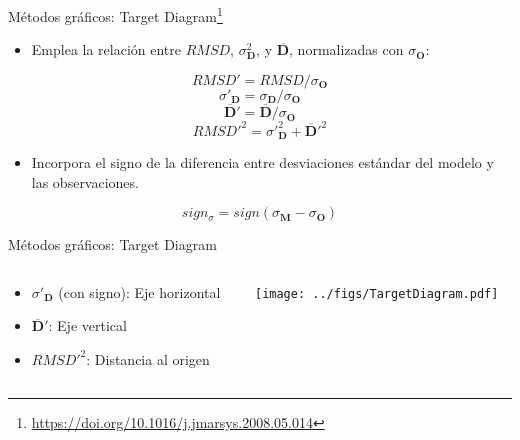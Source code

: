 \documentclass[aspectratio=169, usenames,svgnames,dvipsnames]{beamer}
\begin{document}
\begin{frame}[label={sec:org9e0d24e}]{Métodos gráficos: Target Diagram\footnote{\url{https://doi.org/10.1016/j.jmarsys.2008.05.014}}}
\begin{itemize}
\item Emplea la relación entre \(RMSD\), \(\sigma^2_{\mathbf{D}}\), y \(\overline{\mathbf{D}}\), normalizadas con \(\sigma_{\mathbf{O}}\):
\end{itemize}
  \[
  RMSD' = RMSD / \sigma_{\mathbf{O}}
  \]
\[
  \sigma'_{\mathbf{D}} = \sigma_{\mathbf{D}} / \sigma_{\mathbf{O}} 
\]
\[
\overline{\mathbf{D}}' = \overline{\mathbf{D}} / \sigma_{\mathbf{O}}
\]
\[
RMSD'^2= \sigma'^2_{\mathbf{D}} + \overline{\mathbf{D}}'^2
\]

\begin{itemize}
\item Incorpora el signo de la diferencia entre desviaciones estándar del modelo y las observaciones.
\end{itemize}
\[
sign_{\sigma} =  sign(\sigma_{\mathbf{M}} - \sigma_{\mathbf{O}} )
\]
\end{frame}


\begin{frame}[label={sec:orgbf49654}]{Métodos gráficos: Target Diagram}
\begin{columns}
\begin{column}{0.4\columnwidth}
\begin{itemize}
\item \(\sigma'_{\mathbf{D}}\) (con signo): Eje horizontal
\item \(\overline{\mathbf{D}}'\): Eje vertical
\item \(RMSD'^2\): Distancia al origen
\end{itemize}
\end{column}

\begin{column}{0.6\columnwidth}
\begin{center}
\texttt{[image: ../figs/TargetDiagram.pdf]}
\end{center}
\end{column}
\end{columns}
\end{frame}
\end{document}
